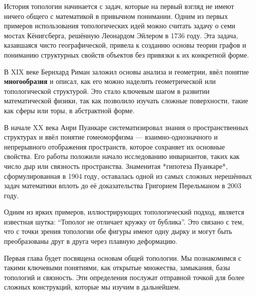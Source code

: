 \documentclass[a4paper, 12pt]{book}
\begin{document}
История топологии начинается с задач, которые на первый взгляд не имеют ничего общего с математикой в привычном понимании. Одним из первых примеров использования топологических идей можно считать задачу о семи мостах Кёнигсберга, решённую Леонардом Эйлером в 1736 году. Эта задача, казавшаяся чисто географической, привела к созданию основы теории графов и пониманию структурных свойств объектов без привязки к их конкретной форме.

\bigskip

В XIX веке Бернхард Риман заложил основы анализа и геометрии, ввёл понятие \textbf{многообразия} и описал, как его можно наделить геометрической или топологической структурой. Это стало ключевым шагом в развитии математической физики, так как позволило изучать сложные поверхности, такие как сферы или торы, в абстрактной форме.

\bigskip

В начале XX века Анри Пуанкаре систематизировал знания о пространственных структурах и ввёл понятие гомеоморфизма — взаимно-однозначного и непрерывного отображения пространств, которое сохраняет их основные свойства. Его работы положили начало исследованию инвариантов, таких как число дыр или связность пространства. Знаменитая *гипотеза Пуанкаре*, сформулированная в 1904 году, оставалась одной из самых сложных нерешённых задач математики вплоть до её доказательства Григорием Перельманом в 2003 году.

\bigskip

Одним из ярких примеров, иллюстрирующих топологический подход, является известная шутка: ``Тополог не отличает кружку от бублика''. Это связано с тем, что с точки зрения топологии обе фигуры имеют одну дырку и могут быть преобразованы друг в друга через плавную деформацию.

\bigskip


Первая глава будет посвящена основам общей топологии. Мы познакомимся с такими ключевыми понятиями, как открытые множества, замыкания, базы топологий и связность. Эти определения послужат отправной точкой для более сложных конструкций, которые мы изучим в дальнейшем.

\bigskip


	


\newpage


\newpage



\newpage




\newpage


\newpage


\newpage



\newpage

	

\newpage


\newpage

\end{document}
